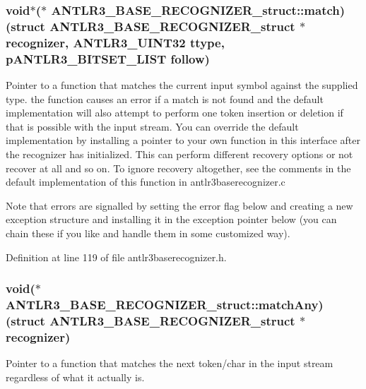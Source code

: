 \hypertarget{struct_a_n_t_l_r3___b_a_s_e___r_e_c_o_g_n_i_z_e_r__struct_abdaa022d2f256393fbb0f506d6ba8dd4}{
\subsubsection[{match}]{\setlength{\rightskip}{0pt plus 5cm}void$\ast$($\ast$ A\-N\-T\-L\-R3\-\_\-\-B\-A\-S\-E\-\_\-\-R\-E\-C\-O\-G\-N\-I\-Z\-E\-R\-\_\-struct\-::match)(struct {\bf A\-N\-T\-L\-R3\-\_\-\-B\-A\-S\-E\-\_\-\-R\-E\-C\-O\-G\-N\-I\-Z\-E\-R\-\_\-struct} $\ast${\bf recognizer}, {\bf A\-N\-T\-L\-R3\-\_\-\-U\-I\-N\-T32} ttype, {\bf p\-A\-N\-T\-L\-R3\-\_\-\-B\-I\-T\-S\-E\-T\-\_\-\-L\-I\-S\-T} {\bf follow})}}\label{struct_a_n_t_l_r3___b_a_s_e___r_e_c_o_g_n_i_z_e_r__struct_abdaa022d2f256393fbb0f506d6ba8dd4}
Pointer to a function that matches the current input symbol against the supplied type. the function causes an error if a match is not found and the default implementation will also attempt to perform one token insertion or deletion if that is possible with the input stream. You can override the default implementation by installing a pointer to your own function in this interface after the recognizer has initialized. This can perform different recovery options or not recover at all and so on. To ignore recovery altogether, see the comments in the default implementation of this function in antlr3baserecognizer.\-c

Note that errors are signalled by setting the error flag below and creating a new exception structure and installing it in the exception pointer below (you can chain these if you like and handle them in some customized way). 

Definition at line 119 of file antlr3baserecognizer.\-h.

\hypertarget{struct_a_n_t_l_r3___b_a_s_e___r_e_c_o_g_n_i_z_e_r__struct_a67f20df806406e1ff3787f67399c6ee6}{
\subsubsection[{match\-Any}]{\setlength{\rightskip}{0pt plus 5cm}void($\ast$ A\-N\-T\-L\-R3\-\_\-\-B\-A\-S\-E\-\_\-\-R\-E\-C\-O\-G\-N\-I\-Z\-E\-R\-\_\-struct\-::match\-Any)(struct {\bf A\-N\-T\-L\-R3\-\_\-\-B\-A\-S\-E\-\_\-\-R\-E\-C\-O\-G\-N\-I\-Z\-E\-R\-\_\-struct} $\ast${\bf recognizer})}}\label{struct_a_n_t_l_r3___b_a_s_e___r_e_c_o_g_n_i_z_e_r__struct_a67f20df806406e1ff3787f67399c6ee6}
Pointer to a function that matches the next token/char in the input stream regardless of what it actually is. 

